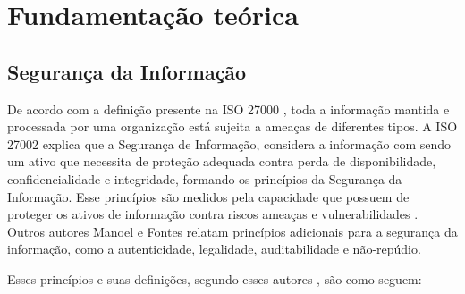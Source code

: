 \chapter{\label{chap:intro}Fundamentação teórica}

\section{Segurança da Informação}

De acordo com a definição presente na ISO 27000 \cite{ISO27000}, toda a informação mantida e processada por uma organização está sujeita a ameaças de diferentes tipos. A ISO 27002 explica que a Segurança de Informação, considera a informação com sendo um ativo que necessita de proteção adequada contra perda de disponibilidade, confidencialidade e integridade, formando os princípios da Segurança da Informação. Esse princípios são medidos pela capacidade que possuem de proteger os ativos de informação contra riscos ameaças e vulnerabilidades  \cite{hintzbergen2018fundamentos}. Outros autores  Manoel \cite{da2014governancca} e Fontes \cite{fontes2017segurancca}  relatam  princípios adicionais para a segurança da informação, como a autenticidade, legalidade, auditabilidade e não-repúdio. 

Esses princípios e suas definições, segundo esses autores \cite{da2014governancca}, \cite{fontes2017segurancca} são como seguem:

